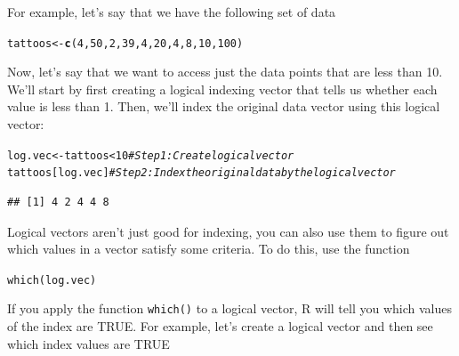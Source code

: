\documentclass{tufte-book}\usepackage[]{graphicx}\usepackage[]{color}
\makeatletter
\newcommand{\hlnum}[1]{\textcolor[rgb]{0.686,0.059,0.569}{#1}}%
\newcommand{\hlcom}[1]{\textcolor[rgb]{0.678,0.584,0.686}{\textit{#1}}}%
\newcommand{\hlopt}[1]{\textcolor[rgb]{0,0,0}{#1}}%
\newcommand{\hlstd}[1]{\textcolor[rgb]{0.345,0.345,0.345}{#1}}%
\newcommand{\hlkwb}[1]{\textcolor[rgb]{0.69,0.353,0.396}{#1}}%
\newcommand{\hlkwd}[1]{\textcolor[rgb]{0.737,0.353,0.396}{\textbf{#1}}}%
\newenvironment{kframe}{%
 \def\at@end@of@kframe{}%
 \ifinner\ifhmode%
  \def\at@end@of@kframe{\end{minipage}}%
  \begin{minipage}{\columnwidth}%
 \fi\fi%
 \def\FrameCommand##1{\hskip\@totalleftmargin \hskip-\fboxsep
 \colorbox{shadecolor}{##1}\hskip-\fboxsep
     \hskip-\linewidth \hskip-\@totalleftmargin \hskip\columnwidth}%
 \MakeFramed {\advance\hsize-\width
   \@totalleftmargin\z@ \linewidth\hsize
   \@setminipage}}%
 {\par\unskip\endMakeFramed%
 \at@end@of@kframe}
\newenvironment{knitrout}{}{} %
\newcommand{\newfun}[1]{\begin{LARGE} \begin{center} \texttt{#1} \end{center} \end{LARGE}}
\makeatother
\begin{document}
For example, let's say that we have the following set of data


\begin{knitrout}
\color{fgcolor}\begin{kframe}
\begin{alltt}
\hlstd{tattoos} \hlkwb{<-} \hlkwd{c}\hlstd{(}\hlnum{4}\hlstd{,} \hlnum{50}\hlstd{,} \hlnum{2}\hlstd{,} \hlnum{39}\hlstd{,} \hlnum{4}\hlstd{,} \hlnum{20}\hlstd{,} \hlnum{4}\hlstd{,} \hlnum{8}\hlstd{,} \hlnum{10}\hlstd{,} \hlnum{100}\hlstd{)}
\end{alltt}
\end{kframe}
\end{knitrout}


Now, let's say that we want to access just the data points that are less than 10. We'll start by first creating a logical indexing vector that tells us whether each value is less than 1. Then, we'll index the original data vector using this logical vector:


\begin{knitrout}
\color{fgcolor}\begin{kframe}
\begin{alltt}
\hlstd{log.vec} \hlkwb{<-} \hlstd{tattoos} \hlopt{<} \hlnum{10} \hlcom{# Step 1: Create logical vector}
\hlstd{tattoos[log.vec]} \hlcom{# Step 2: Index the original data by the logical vector}
\end{alltt}
\begin{verbatim}
## [1] 4 2 4 4 8
\end{verbatim}
\end{kframe}
\end{knitrout}



Logical vectors aren't just good for indexing, you can also use them to figure out which values in a vector satisfy some criteria. To do this, use the function 

\newfun{which(log.vec)}%

If you apply the function \texttt{which()} to a logical vector, R will tell you which values of the index are TRUE. For example, let's create a logical vector and then see which index values are TRUE
\end{document}
